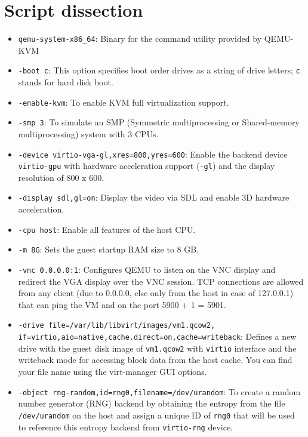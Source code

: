 \documentclass[a4paper,12pt, final]{report}
\begin{document}

\section{Script dissection}
\begin{itemize}
    \item \texttt{qemu-system-x86\_64}: Binary for the command utility provided by QEMU-KVM
    \item \texttt{-boot c}: This option specifies boot order drives as a string of drive letters; \texttt{c} stands for hard disk boot.
    \item \texttt{-enable-kvm}: To enable KVM full virtualization support.
    \item \texttt{-smp 3}: To simulate an SMP (Symmetric multiprocessing or Shared-memory multiprocessing) system with 3 CPUs.
    \item \texttt{-device virtio-vga-gl,xres=800,yres=600}: Enable the backend device \verb|virtio-gpu| with hardware acceleration support (\verb|-gl|) and the display resolution of 800 x 600.
    \item \texttt{-display sdl,gl=on}: Display the video via SDL and enable 3D hardware acceleration.
    \item \texttt{-cpu host}: Enable all features of the host CPU.
    \item \texttt{-m 8G}: Sets the guest startup RAM size to 8 GB.
    \item \texttt{-vnc 0.0.0.0:1}: Configures QEMU to listen on the VNC display and redirect the VGA display over the VNC session. TCP connections are allowed from any client (due to 0.0.0.0, else only from the host in case of 127.0.0.1) that can ping the VM and on the port 5900 + 1 = 5901.
    \item \texttt{-drive file=/var/lib/libvirt/images/vm1.qcow2, \newline if=virtio,aio=native,cache.direct=on,cache=writeback}: Defines a new drive with the guest disk image of \verb|vm1.qcow2| with \verb|virtio| interface and the writeback mode for accessing block data from the host cache. You can find your file name using the virt-manager GUI options. 
    \item \texttt{-object rng-random,id=rng0,filename=/dev/urandom}: To create a random number generator (RNG) backend by obtaining the entropy from the file \verb|/dev/urandom| on the host and assign a unique ID of \verb|rng0| that will be used to reference this entropy backend from \verb|virtio-rng| device.

\end{itemize}
\end{document}
